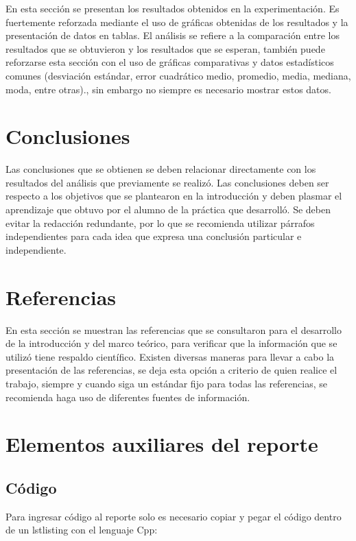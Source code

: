 \documentclass[times,5p, twocolumn]{elsarticle}
\begin{document}
En esta sección se presentan los resultados obtenidos en la experimentación. Es fuertemente reforzada mediante el uso de gráficas obtenidas de los resultados y la presentación de datos en tablas. El análisis se refiere a la comparación entre los resultados que se obtuvieron y los resultados que se esperan, también puede reforzarse esta sección con el uso de gráficas comparativas y datos estadísticos comunes (desviación estándar, error cuadrático medio, promedio, media, mediana, moda, entre otras)., sin embargo no siempre es necesario mostrar estos datos.

\section{Conclusiones}

\cite{Yeadon} Las conclusiones que se obtienen se deben relacionar directamente con los resultados del análisis que previamente se realizó. Las conclusiones deben ser respecto a los objetivos que se plantearon en la introducción y deben plasmar el aprendizaje que obtuvo por el alumno de la práctica que desarrolló. Se deben evitar la redacción redundante, por lo que se recomienda utilizar párrafos independientes para cada idea que expresa una conclusión particular e independiente.


\section{Referencias}
En esta sección se muestran las referencias que se consultaron para el desarrollo de la introducción y del marco teórico, para verificar que la información que se utilizó tiene respaldo científico. Existen diversas maneras para llevar a cabo la presentación de las referencias, se deja esta opción a criterio de quien realice el trabajo, siempre y cuando siga un estándar fijo para todas las referencias, se recomienda haga uso de diferentes fuentes de información.

\section{Elementos auxiliares del reporte}




\subsection{Código}
Para ingresar código al reporte solo es necesario copiar y pegar el código dentro de un lstlisting con el lenguaje Cpp:
\end{document}

